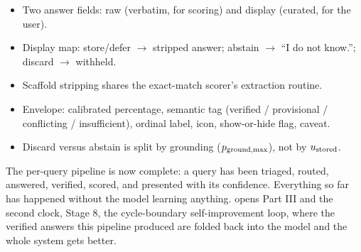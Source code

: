 \begin{bythenumbers}
\begin{itemize}[leftmargin=1.3em, itemsep=1pt]
  \item Two answer fields: raw (verbatim, for scoring) and display (curated, for the user).
  \item Display map: store/defer $\to$ stripped answer; abstain $\to$ ``I do not know.''; discard $\to$ withheld.
  \item Scaffold stripping shares the exact-match scorer's extraction routine.
  \item Envelope: calibrated percentage, semantic tag (verified / provisional / conflicting / insufficient), ordinal label, icon, show-or-hide flag, caveat.
  \item Discard versus abstain is split by grounding ($p_{\text{ground,max}}$), not by $u_{\text{stored}}$.
\end{itemize}
\end{bythenumbers}

The per-query pipeline is now complete: a query has been triaged, routed, answered,
verified, scored, and presented with its confidence. Everything so far has happened
without the model learning anything.  opens Part III and the second
clock, Stage 8, the cycle-boundary self-improvement loop, where the verified answers
this pipeline produced are folded back into the model and the whole system gets better.
